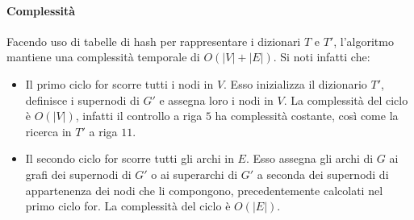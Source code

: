 \paragraph{Complessità}
Facendo uso di tabelle di hash per rappresentare i dizionari $T$ e $T'$, l'algoritmo mantiene una complessit\`a
temporale di $O(|V| + |E|)$.
Si noti infatti che:
\begin{itemize}
    \item Il primo ciclo for scorre tutti i nodi in $V$.
    Esso inizializza il dizionario $T'$, definisce i supernodi di $G'$ e assegna loro i nodi in $V$.
    La complessit\`a del ciclo \`e $O(|V|)$, infatti il controllo a riga $5$ ha complessit\`a costante,
    cos\`i come la ricerca in $T'$ a riga $11$.
    \item Il secondo ciclo for scorre tutti gli archi in $E$.
    Esso assegna gli archi di $G$ ai grafi dei supernodi di $G'$ o ai superarchi di $G'$ a seconda dei supernodi
    di appartenenza dei nodi che li compongono, precedentemente calcolati nel primo ciclo for.
    La complessit\`a del ciclo \`e $O(|E|)$.
\end{itemize}